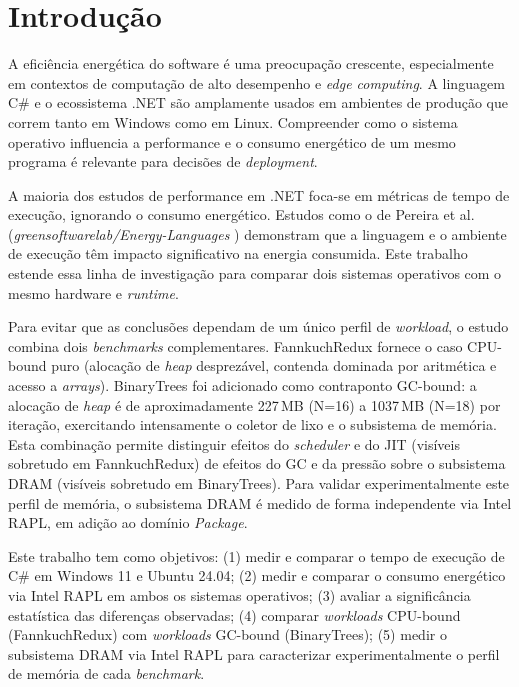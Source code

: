 \documentclass[12pt,a4paper]{article}
\begin{document}
\section{Introdução}

A eficiência energética do software é uma preocupação crescente, especialmente em
contextos de computação de alto desempenho e \textit{edge computing}.
A linguagem C\# e o ecossistema .NET são amplamente usados em ambientes de
produção que correm tanto em Windows como em Linux.
Compreender como o sistema operativo influencia a performance e o consumo
energético de um mesmo programa é relevante para decisões de \textit{deployment}.

A maioria dos estudos de performance em .NET foca-se em métricas de tempo de
execução, ignorando o consumo energético.
Estudos como o de Pereira et al.\ \cite{Pereira2017}
(\textit{greensoftwarelab/Energy-Languages} \cite{EnergyLanguages}) demonstram
que a linguagem e o ambiente de execução têm impacto significativo na energia
consumida.
Este trabalho estende essa linha de investigação para comparar dois sistemas
operativos com o mesmo hardware e \textit{runtime}.

Para evitar que as conclusões dependam de um único perfil de \textit{workload},
o estudo combina dois \textit{benchmarks} complementares.
FannkuchRedux fornece o caso CPU-bound puro (alocação de \textit{heap}
desprezável, contenda dominada por aritmética e acesso a \textit{arrays}).
BinaryTrees foi adicionado como contraponto GC-bound: a alocação de
\textit{heap} é de aproximadamente 227\,MB (N=16) a 1037\,MB (N=18) por
iteração, exercitando intensamente o coletor de lixo e o subsistema de
memória.
Esta combinação permite distinguir efeitos do \textit{scheduler} e do JIT
(visíveis sobretudo em FannkuchRedux) de efeitos do GC e da pressão sobre o
subsistema DRAM (visíveis sobretudo em BinaryTrees).
Para validar experimentalmente este perfil de memória, o subsistema DRAM é
medido de forma independente via Intel RAPL, em adição ao domínio
\textit{Package}.

Este trabalho tem como objetivos:
(1) medir e comparar o tempo de execução de C\# em Windows 11 e Ubuntu 24.04;
(2) medir e comparar o consumo energético via Intel RAPL em ambos os sistemas
operativos;
(3) avaliar a significância estatística das diferenças observadas;
(4) comparar \textit{workloads} CPU-bound (FannkuchRedux) com \textit{workloads}
GC-bound (BinaryTrees);
(5) medir o subsistema DRAM via Intel RAPL para caracterizar experimentalmente
o perfil de memória de cada \textit{benchmark}.
\end{document}
